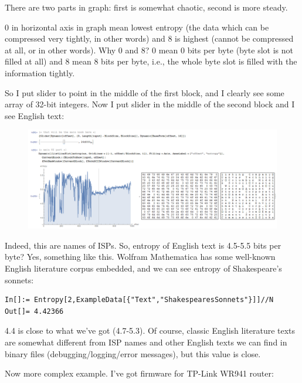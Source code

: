 There are two parts in graph: first is somewhat chaotic, second is more steady.

0 in horizontal axis in graph mean lowest entropy (the data which can be compressed very tightly,  in other words) 
and 8 is highest (cannot be compressed at all,  or  in other words).
Why 0 and 8? 0 mean 0 bits per byte (byte slot is not filled at all) 
and 8 mean 8 bits per byte, i.e., the whole byte slot is filled with the information tightly.

So I put slider to point in the middle of the first block, and I clearly see some array of 32-bit integers.
Now I put slider in the middle of the second block and I see English text:

\begin{figure}[H]
\centering
\includegraphics[scale=\FigScale]{ff/entropy/geoipisp2.png}
\end{figure}

Indeed, this are names of ISPs.
So, entropy of English text is 4.5-5.5 bits per byte? Yes, something like this.
Wolfram Mathematica has some well-known English literature corpus embedded, and we can see entropy of Shakespeare's sonnets:

\begin{lstlisting}
In[]:= Entropy[2,ExampleData[{"Text","ShakespearesSonnets"}]]//N
Out[]= 4.42366
\end{lstlisting}

4.4 is close to what we've got (4.7-5.3). 
Of course, classic English literature texts are somewhat different from ISP names and other English texts we can find in binary files 
(debugging/logging/error messages), but this value is close.


Now more complex example. I've got firmware for TP-Link WR941 router:


